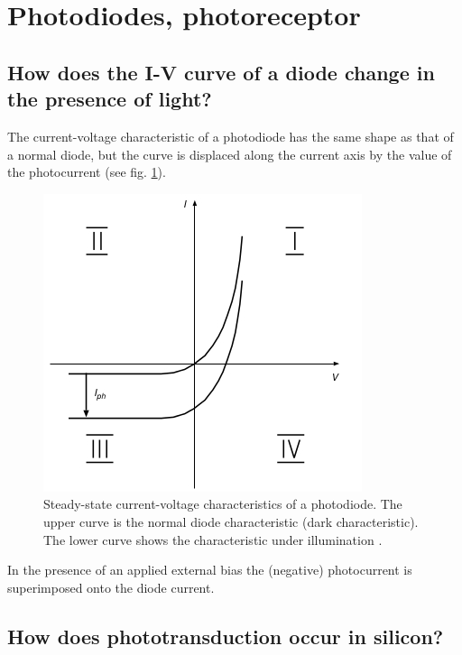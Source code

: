 \documentclass[main]{subfiles}
\begin{document}

\section{Photodiodes, photoreceptor}

\subsection{How does the I-V curve of a diode change in the presence of light?}

The current-voltage characteristic of a photodiode has the same
shape as that of a normal diode, but the curve is displaced along the current
axis by the value of the photocurrent (see fig. \ref{fig:photodiode_charac}).

\begin{figure}[htbp]
  \centering
  \includegraphics[scale=0.8]{pics/photodiode_charac.jpg}
  \caption{Steady-state current-voltage characteristics of a photodiode. The upper curve is the normal diode characteristic (dark characteristic). The lower curve shows the characteristic under illumination \cite{book:VLSI}.}
  \label{fig:photodiode_charac}
\end{figure} 

In the presence of an applied external bias the (negative) photocurrent  is superimposed onto the diode current.

\subsection{How does phototransduction occur in silicon?}
\end{document}
